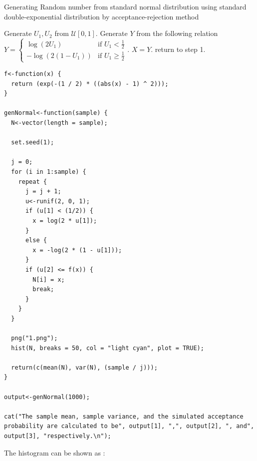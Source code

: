 \documentclass[11pt]{article}
\begin{document}
\begin{algorithm}[H]
\caption{Generating Random number from standard normal distribution using standard double-exponential distribution by acceptance-rejection method}
\begin{algorithmic}[1]
\STATE Generate $U_1, U_2$ from $\mathcal{U}[0,1]$.
\STATE Generate $Y$ from the following relation $Y = \begin{cases} \log(2U_1) & \text{if $U_1 < \frac{1}{2}$} \\ -\log(2(1 - U_1)) & \text{if $U_1 \geq \frac{1}{2}$} \end{cases}$.
{}
  \STATE  $X = Y$.
\ELSE
  \STATE  return to step 1.
\ENDIF
\end{algorithmic}
\end{algorithm}

\newpage


\begin{lstlisting}
f<-function(x) {
  return (exp(-(1 / 2) * ((abs(x) - 1) ^ 2)));
}

genNormal<-function(sample) {
  N<-vector(length = sample);

  set.seed(1);

  j = 0;
  for (i in 1:sample) {
    repeat {
      j = j + 1;
      u<-runif(2, 0, 1);
      if (u[1] < (1/2)) {
        x = log(2 * u[1]);
      }
      else {
        x = -log(2 * (1 - u[1]));
      }
      if (u[2] <= f(x)) {
        N[i] = x;
        break;
      }
    }
  }

  png("1.png");
  hist(N, breaks = 50, col = "light cyan", plot = TRUE);

  return(c(mean(N), var(N), (sample / j)));
}

output<-genNormal(1000);

cat("The sample mean, sample variance, and the simulated acceptance probability are calculated to be", output[1], ",", output[2], ", and", output[3], "respectively.\n");

\end{lstlisting}
\newpage
{}

The histogram can be shown as :
\end{document}
